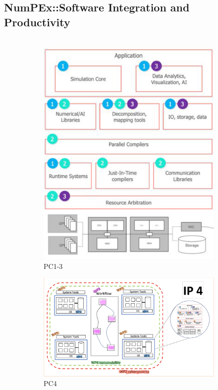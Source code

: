 \subsection{NumPEx::Software Integration and Productivity}
\begin{frame}
  \frametitle{\insertsectionhead}
  \framesubtitle{\insertsubsectionhead}

  \begin{columns}[t]
    \begin{column}{.5\textwidth}
       \begin{figure}[ht]%
         \centering
          \begin{subfigure}{.45\textwidth}\centering
            \includegraphics[height=0.5\textwidth]{../figures/numpex-ip123.png}
            \caption{PC1-3}
          \end{subfigure}          
          \begin{subfigure}{.5\textwidth}\centering
            \includegraphics[width=.9\textwidth]{../figures/numpex-ip4.png}
            \caption{PC4}
          \end{subfigure}
          \newline
           \begin{subfigure}{.9\textwidth}\centering

\end{subfigure}
\end{figure}
\end{column}
\end{columns}
\end{frame}
